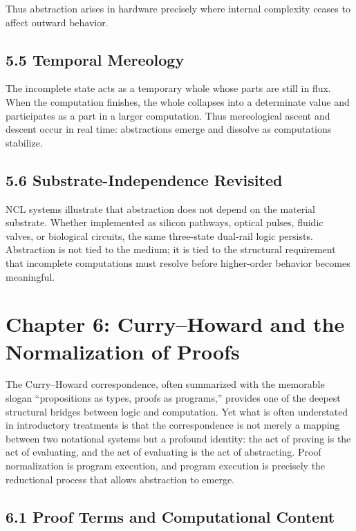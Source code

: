 \documentclass[12pt,letterpaper]{article}
\theoremstyle{remark}
\begin{document}
Thus abstraction arises in hardware precisely where internal complexity ceases to affect outward behavior.

\subsection{5.5 Temporal Mereology}

The incomplete state acts as a temporary whole whose parts are still in flux. When the computation finishes, the whole collapses into a determinate value and participates as a part in a larger computation. Thus mereological ascent and descent occur in real time: abstractions emerge and dissolve as computations stabilize.

\subsection{5.6 Substrate-Independence Revisited}

NCL systems illustrate that abstraction does not depend on the material substrate. Whether implemented as silicon pathways, optical pulses, fluidic valves, or biological circuits, the same three-state dual-rail logic persists. Abstraction is not tied to the medium; it is tied to the structural requirement that incomplete computations must resolve before higher-order behavior becomes meaningful.

\newpage

\section{Chapter 6: Curry--Howard and the Normalization of Proofs}

The Curry--Howard correspondence, often summarized with the memorable slogan ``propositions as types, proofs as programs,'' provides one of the deepest structural bridges between logic and computation. Yet what is often understated in introductory treatments is that the correspondence is not merely a mapping between two notational systems but a profound identity: the act of proving is the act of evaluating, and the act of evaluating is the act of abstracting. Proof normalization is program execution, and program execution is precisely the reductional process that allows abstraction to emerge.

\subsection{6.1 Proof Terms and Computational Content}
\end{document}
